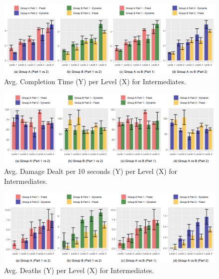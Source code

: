 \begin{figure}[!ht]
    \begin{center}
    \caption{Avg. Completion Time (Y) per Level (X) for Intermediates.}
        \includegraphics[width=34em]{figures/completion_time-intermediate_players.png}
    \end{center}
    \label{fig:result-metric-intermediates-completion-time}
\end{figure}

\begin{figure}[!ht]
    \begin{center}
    \caption{Avg. Damage Dealt per 10 seconds (Y) per Level (X) for Intermediates.}
        \includegraphics[width=34em]{figures/damage_dealt_per_10s-intermediate_players.png}
    \end{center}
    \label{fig:result-metric-intermediates-damage-dealt-per-10s}
\end{figure}

\begin{figure}[!ht]
    \begin{center}
    \caption{Avg. Deaths (Y) per Level (X) for Intermediates.}
        \includegraphics[width=34em]{figures/deaths_per_level-intermediate_players.png}
    \end{center}
    \label{fig:result-metric-intermediates-deaths-per-level}
\end{figure}

